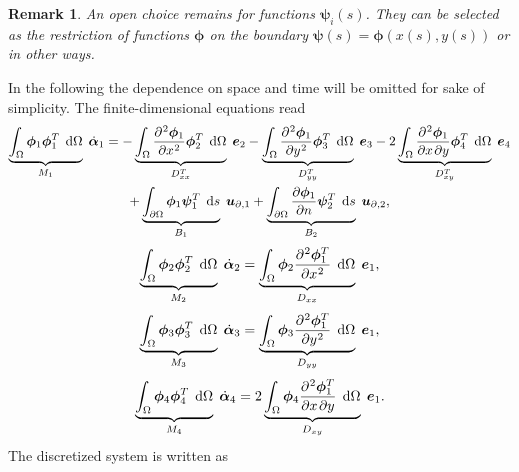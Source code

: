 \documentclass[preprint,12pt]{elsarticle}
\newtheorem{remark}{Remark}
\begin{document}
	\begin{remark}
		An open choice remains for functions $\bm{\psi}_i(s)$. They can be selected as the restriction of functions $\bm{\phi}$ on the boundary $\bm{\psi}(s) = \bm{\phi}(x(s),y(s))$ or in other ways.
	\end{remark}
	In the following the dependence on space and time will be omitted for sake of simplicity. The finite-dimensional equations read
	\begin{multline}
	\underbrace{\int_{\Omega} \bm{\phi}_1 \bm{\phi}_1^T \, \d\Omega}_{M_1} \; \dot{\bm{\alpha}}_1 = - \underbrace{\int_{\Omega}  \diffp[2]{\bm{\phi}_1}{x} \bm{\phi}_2^T \, \d\Omega}_{D_{xx}^T} \; \bm{e}_2 - \underbrace{\int_{\Omega}  \diffp[2]{\bm{\phi}_1}{y} \bm{\phi}_3^T \, \d\Omega}_{D_{yy}^T} \; \bm{e}_3 - 2 \underbrace{\int_{\Omega} \diffp{\bm{\phi}_1}{x,y} \bm{\phi}_4^T \, \d\Omega}_{D_{xy}^T} \; \bm{e}_4\\
	+\underbrace{\int_{\partial \Omega} \bm{\phi}_1 \bm{\psi}_1^T \, \d{s}}_{B_1} \; \bm{u}_{\partial, 1} + \underbrace{\int_{\partial \Omega} \diffp{\bm{\phi}_1}{n} \bm{\psi}_2^T \, \d{s}}_{B_2} \; \bm{u}_{\partial, 2},
	\end{multline}
	\begin{equation}
	\underbrace{\int_{\Omega} \bm{\phi}_2 \bm{\phi}_2^T \, \d\Omega}_{M_2}  \; \dot{\bm{\alpha}}_2 =  \underbrace{\int_{\Omega} \bm{\phi}_2  \diffp[2]{\bm{\phi}_1^T}{x} \, \d\Omega}_{D_{xx}} \; \bm{e}_1,
	\end{equation}
	\begin{equation}
	\underbrace{\int_{\Omega} \bm{\phi}_3 \bm{\phi}_3^T \, \d\Omega}_{M_3}  \; \dot{\bm{\alpha}}_3 =  \underbrace{\int_{\Omega} \bm{\phi}_3  \diffp[2]{\bm{\phi}_1^T}{y} \, \d\Omega}_{D_{yy}} \; \bm{e}_1,
	\end{equation}
	\begin{equation}
	\underbrace{\int_{\Omega} \bm{\phi}_4 \bm{\phi}_4^T \, \d\Omega}_{M_4}  \; \dot{\bm{\alpha}}_4 = 2  \underbrace{\int_{\Omega} \bm{\phi}_4  \diffp{\bm{\phi}_1^T}{x,y} \, \d\Omega}_{D_{xy}} \; \bm{e}_1. 
	\end{equation}
	The discretized system is written as 
\end{document}
